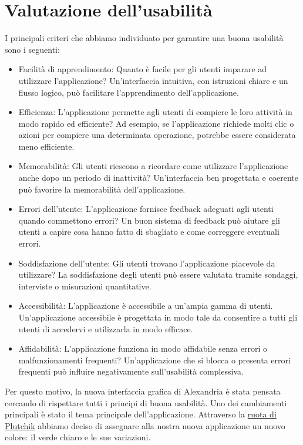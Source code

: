 \raggedright{\section{Valutazione dell'usabilità}}
I principali criteri che abbiamo individuato per garantire una buona usabilità sono i seguenti:
\begin{itemize}
    \item Facilità di apprendimento: Quanto è facile per gli utenti imparare ad utilizzare l'applicazione? Un'interfaccia intuitiva, con istruzioni chiare e un flusso logico, può facilitare l'apprendimento dell'applicazione.

    \item Efficienza: L'applicazione permette agli utenti di compiere le loro attività in modo rapido ed efficiente? Ad esempio, se l'applicazione richiede molti clic o azioni per compiere una determinata operazione, potrebbe essere considerata meno efficiente.

    \item Memorabilità: Gli utenti riescono a ricordare come utilizzare l'applicazione anche dopo un periodo di inattività? Un'interfaccia ben progettata e coerente può favorire la memorabilità dell'applicazione.

    \item Errori dell'utente: L'applicazione fornisce feedback adeguati agli utenti quando commettono errori? Un buon sistema di feedback può aiutare gli utenti a capire cosa hanno fatto di sbagliato e come correggere eventuali errori.

    \item Soddisfazione dell'utente: Gli utenti trovano l'applicazione piacevole da utilizzare? La soddisfazione degli utenti può essere valutata tramite sondaggi, interviste o misurazioni quantitative.

    \item Accessibilità: L'applicazione è accessibile a un'ampia gamma di utenti. Un'applicazione accessibile è progettata in modo tale da consentire a tutti gli utenti di accedervi e utilizzarla in modo efficace.

    \item Affidabilità: L'applicazione funziona in modo affidabile senza errori o malfunzionamenti frequenti? Un'applicazione che si blocca o presenta errori frequenti può influire negativamente sull'usabilità complessiva.
    
\end{itemize} 
Per questo motivo, la nuova interfaccia grafica di Alexandria è stata pensata cercando di rispettare tutti i principi di buona usabilità. Uno dei cambiamenti principali è stato il tema principale dell'applicazione. Attraverso la \href{https://www.my-personaltrainer.it/salute-benessere/la-ruota-delle-emozioni-di-plutchik-cos-e-a-cosa-serve-e-quali-sono-i-suoi-benefici.html}{ruota di Plutchik} abbiamo deciso di assegnare alla nostra nuova applicazione un nuovo colore: il verde chiaro e le sue variazioni. \\~\\
